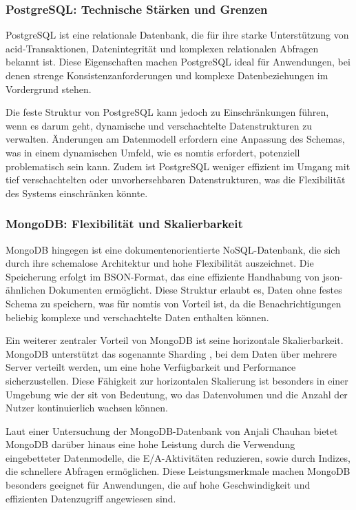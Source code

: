 \subsubsection{PostgreSQL: Technische Stärken und Grenzen}
PostgreSQL ist eine relationale Datenbank, die für ihre starke Unterstützung von \ac{acid}-Transaktionen, Datenintegrität und komplexen relationalen Abfragen bekannt ist. Diese Eigenschaften machen PostgreSQL ideal für Anwendungen, bei denen strenge Konsistenzanforderungen und komplexe Datenbeziehungen im Vordergrund stehen.

Die feste Struktur von PostgreSQL kann jedoch zu Einschränkungen führen, wenn es darum geht, dynamische und verschachtelte Datenstrukturen zu verwalten. Änderungen am Datenmodell erfordern eine Anpassung des Schemas, was in einem dynamischen Umfeld, wie es \ac{nomtis} erfordert, potenziell problematisch sein kann. Zudem ist PostgreSQL weniger effizient im Umgang mit tief verschachtelten oder unvorhersehbaren Datenstrukturen, was die Flexibilität des Systems einschränken könnte.

\subsubsection{MongoDB: Flexibilität und Skalierbarkeit}
MongoDB hingegen ist eine dokumentenorientierte NoSQL-Datenbank, die sich durch ihre schemalose Architektur und hohe Flexibilität auszeichnet. Die Speicherung erfolgt im BSON-Format, das eine effiziente Handhabung von \ac{json}-ähnlichen Dokumenten ermöglicht. Diese Struktur erlaubt es, Daten ohne festes Schema zu speichern, was für \ac{nomtis} von Vorteil ist, da die Benachrichtigungen beliebig komplexe und verschachtelte Daten enthalten können.

Ein weiterer zentraler Vorteil von MongoDB ist seine horizontale Skalierbarkeit. MongoDB unterstützt das sogenannte \glqq Sharding \grqq, bei dem Daten über mehrere Server verteilt werden, um eine hohe Verfügbarkeit und Performance sicherzustellen. Diese Fähigkeit zur horizontalen Skalierung ist besonders in einer Umgebung wie der \ac{sit} von Bedeutung, wo das Datenvolumen und die Anzahl der Nutzer kontinuierlich wachsen können.

Laut einer Untersuchung der MongoDB-Datenbank von Anjali Chauhan bietet MongoDB darüber hinaus eine hohe Leistung durch die Verwendung eingebetteter Datenmodelle, die E/A-Aktivitäten reduzieren, sowie durch Indizes, die schnellere Abfragen ermöglichen. \cite{Chauhan2019}
Diese Leistungsmerkmale machen MongoDB besonders geeignet für Anwendungen, die auf hohe Geschwindigkeit und effizienten Datenzugriff angewiesen sind.

